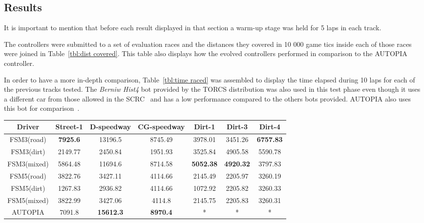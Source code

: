	
\subsection{Results} \label{subsec:Results}
	
	It is important to mention that before each result displayed in that section a warm-up stage was held for 5 laps in each track.
	
	The controllers were submitted to a set of evaluation races and the distances they covered in 10 000 game tics inside each of those races were joined in Table~\ref{tbl:dist covered}. This table also displays how the evolved controllers performed in comparison to the AUTOPIA controller.
	
	In order to have a more in-depth comparison, Table~\ref{tbl:time raced} was assembled to display the time elapsed during 10 laps for each of the previous tracks tested. The \textit{Berniw Hist4} bot provided by the TORCS distribution was also used in this test phase even though it uses a different car from those allowed in the SCRC~\cite{2009} and has a low performance compared to the others bots provided. AUTOPIA also uses this bot for comparison~\cite{AUTOPIA}.
	
	\begin{table*}[t]
	\renewcommand{\arraystretch}{1.3}
	\caption{Distance covered in meters racing alone for 10 000 game tics}
	\label{tbl:dist covered}
	\centering
	\begin{tabular}{c||c||c||c||c||c||c}
	\hline
	\bfseries Driver & \bfseries Street-1 & \bfseries D-speedway & \bfseries CG-speedway & \bfseries Dirt-1 & \bfseries Dirt-3 & \bfseries Dirt-4 \\ 
	\hline	
	\hline FSM3(road) & \textbf{7925.6} & 13196.5 & 8745.49 & 3978.01 & 3451.26 & \textbf{6757.83} \\
	\hline FSM3(dirt) & 2149.77	& 2450.84 & 1951.93	& 3525.84 & 4905.58 & 5590.78 \\
	\hline FSM3(mixed) & 5864.48 & 11694.6 & 8714.58 & \textbf{5052.38} & \textbf{4920.32} & 3797.83 \\
	\hline FSM5(road) & 3822.76 & 3427.11 & 4114.66	& 2145.49 &	2205.97 & 3260.19 \\
	\hline FSM5(dirt) & 1267.83 & 2936.82 &	4114.66 & 1072.92 &	2205.82 & 3260.33 \\
	\hline FSM5(mixed) & 3822.99 & 3427.06 & 4114.8 & 2145.75 &	2205.83 & 3260.31 \\
	\hline AUTOPIA & 7091.8 & \textbf{15612.3} & \textbf{8970.4} & * & * & * \\
	\hline 
	\end{tabular} 
	\end{table*}


